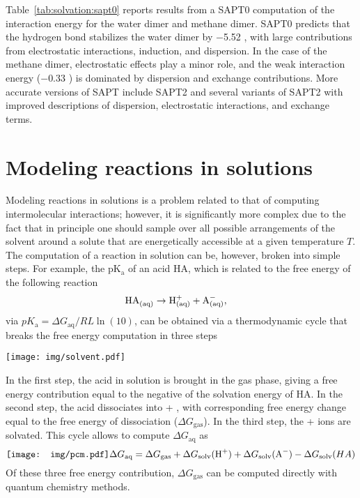 \documentclass[../Main/notes.tex]{subfiles}
\begin{document}
Table~\ref{tab:solvation:sapt0} reports results from a SAPT0 computation of the interaction energy for the water dimer and methane dimer.
SAPT0 predicts that the hydrogen bond stabilizes the water dimer by $-$5.52 \kcal, with large contributions from electrostatic interactions, induction, and dispersion.
In the case of the methane dimer, electrostatic effects play a minor role, and the weak interaction energy ($-$0.33 \kcal) is dominated by dispersion and exchange contributions.
More accurate versions of SAPT include SAPT2 and several variants of SAPT2 with improved descriptions of dispersion, electrostatic interactions, and exchange terms.

\section{Modeling reactions in solutions}


Modeling reactions in solutions is a problem related to that of computing intermolecular interactions; however, it is significantly more complex due to the fact that in principle one should sample over all possible arrangements of the solvent around a solute that are energetically accessible at a given temperature $T$.
The computation of a reaction in solution can be, however, broken into simple steps.
For example, the pK$_\mathrm{a}$ of an acid HA, which is related to the free energy of the following reaction 
\begin{equation}
\ce{HA_{(aq)}} \rightarrow \ce{H^+_{(aq)}} + \ce{A^-_{(aq)}}, \quad 
\end{equation}
via $pK_\mathrm{a} = \Delta G_\textrm{aq} / RL \ln(10)$, can be obtained via a thermodynamic cycle  that breaks the free energy computation in three steps
\begin{center}
\texttt{[image: img/solvent.pdf]}
\end{center}
In the first step, the acid in solution is brought in the gas phase, giving a free energy contribution equal to the negative of the solvation energy of HA.
In the second step, the acid dissociates into  + , with corresponding free energy change equal to the free energy of dissociation ($\Delta G_\textrm{gas}$).
In the third step, the  +  ions are solvated.
This cycle allows to compute $\Delta G_\textrm{aq}$ as
\begin{equation}\texttt{[image: img/pcm.pdf]}

\Delta G_\textrm{aq} = \Delta G_\textrm{gas} + \Delta G_\textrm{solv}(\ce{H^+}) + \Delta G_\textrm{solv}(\ce{A^-})  -\Delta G_\textrm{solv}(HA)
\end{equation}
Of these three free energy contribution, $\Delta G_\textrm{gas}$ can be computed directly with quantum chemistry methods.
\end{document}
